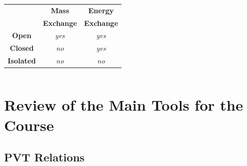 \documentclass[10pt,compress,handout,ignorenonframetext]{beamer}
\begin{document}
\begin{frame}
\begin{columns}
\begin{column}[l]{0.4\linewidth}
\begin{figure}
\begin{center}
        \end{center}
      \end{figure}
      \begin{tabular}{|c|c|c|}
         \hline
                      & {\bf Mass} & {\bf Energy} \\
                      & {\bf Exchange} & {\bf Exchange} \\
         \hline
         {\bf Open}   & {\it yes}  & {\it yes}    \\
         {\bf Closed} & {\it no}   & {\it yes}    \\
         {\bf Isolated}&{\it no}   & {\it no}     \\
         \hline 
      \end{tabular}    
    \end{column}
  \end{columns}
\end{frame}




\section{Review of the Main Tools for the Course}


\subsection{PVT Relations}
\end{document}
